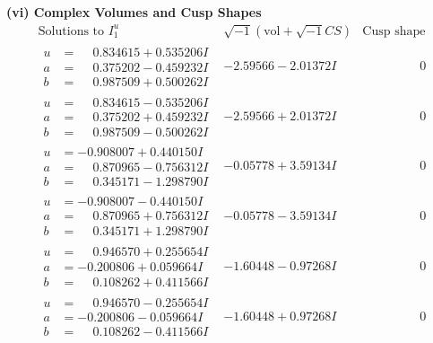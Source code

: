 \documentclass[1p]{elsarticle_modified}
\theoremstyle{definition}
\newcommand{\I}{\sqrt{-1}}
\begin{document}
\newpage\flushleft \textbf{(vi) Complex Volumes and Cusp Shapes}
$$\begin{array}{c|c|c}  
\text{Solutions to }I^u_{1}& \I (\text{vol} + \sqrt{-1}CS) & \text{Cusp shape}\\
 \hline 
\begin{aligned}
u &= \phantom{-}0.834615 + 0.535206 I \\
a &= \phantom{-}0.375202 - 0.459232 I \\
b &= \phantom{-}0.987509 + 0.500262 I\end{aligned}
 & -2.59566 - 2.01372 I & \phantom{-0.000000 } 0 \\ \hline\begin{aligned}
u &= \phantom{-}0.834615 - 0.535206 I \\
a &= \phantom{-}0.375202 + 0.459232 I \\
b &= \phantom{-}0.987509 - 0.500262 I\end{aligned}
 & -2.59566 + 2.01372 I & \phantom{-0.000000 } 0 \\ \hline\begin{aligned}
u &= -0.908007 + 0.440150 I \\
a &= \phantom{-}0.870965 - 0.756312 I \\
b &= \phantom{-}0.345171 - 1.298790 I\end{aligned}
 & -0.05778 + 3.59134 I & \phantom{-0.000000 } 0 \\ \hline\begin{aligned}
u &= -0.908007 - 0.440150 I \\
a &= \phantom{-}0.870965 + 0.756312 I \\
b &= \phantom{-}0.345171 + 1.298790 I\end{aligned}
 & -0.05778 - 3.59134 I & \phantom{-0.000000 } 0 \\ \hline\begin{aligned}
u &= \phantom{-}0.946570 + 0.255654 I \\
a &= -0.200806 + 0.059664 I \\
b &= \phantom{-}0.108262 + 0.411566 I\end{aligned}
 & -1.60448 - 0.97268 I & \phantom{-0.000000 } 0 \\ \hline\begin{aligned}
u &= \phantom{-}0.946570 - 0.255654 I \\
a &= -0.200806 - 0.059664 I \\
b &= \phantom{-}0.108262 - 0.411566 I\end{aligned}
 & -1.60448 + 0.97268 I & \phantom{-0.000000 } 0 \\ \hline\begin{aligned}

\end{aligned}
\end{array}$$
\end{document}
